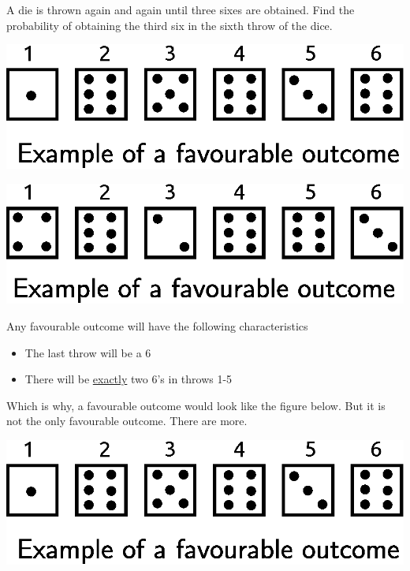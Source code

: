 \documentclass[14pt,fleqn]{extarticle}
\begin{document}
A die is thrown again and again until three 
sixes are obtained. Find the probability of 
obtaining the third six in the sixth throw 
of the dice.
%

\newcard

\includegraphics[scale=0.7]{right.eps} 

\newcard

\includegraphics[scale=0.7]{wrong.eps}

\newcard

Any favourable outcome will have the following characteristics 

\begin{itemize}
\item{The last throw will be a 6} 
\item{There will be \underline{exactly} two 6's in throws 1-5} 
\end{itemize} 

Which is why, a favourable outcome would look like the figure below. 
But it is not the only favourable outcome. There are more. 

\begin{center}
\includegraphics[scale=0.7]{right.eps}  
\end{center} 

\newcard 
\end{document}
